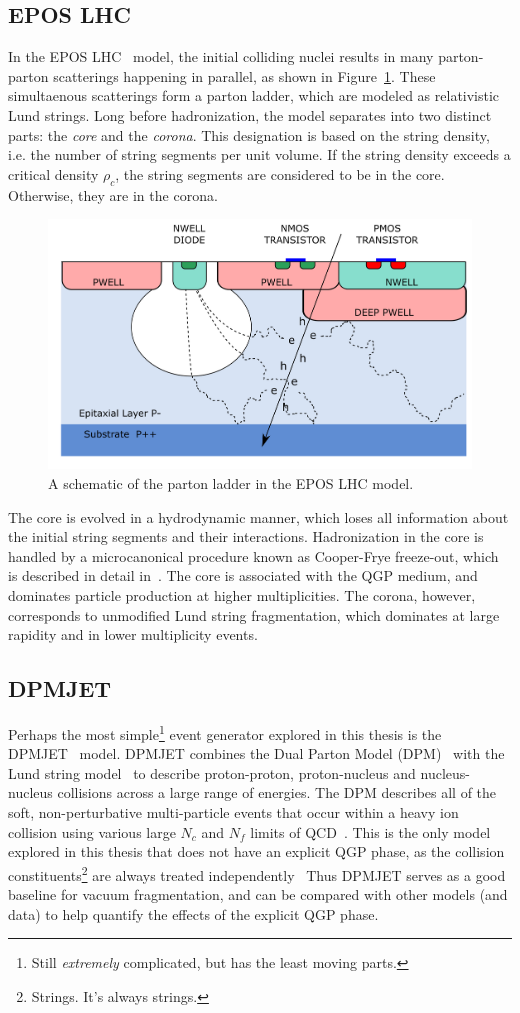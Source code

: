 \subsection{EPOS LHC}

In the EPOS LHC~\cite{EPOSLHC} model, the initial colliding nuclei results in many parton-parton scatterings happening in parallel, as shown in Figure~\ref{fig:parton_ladder}. These simultaenous scatterings form a parton ladder, which are modeled as relativistic Lund strings. Long before hadronization, the model separates into two distinct parts: the \textit{core} and the \textit{corona}. This designation is based on the string density, i.e. the number of string segments per unit volume. If the string density exceeds a critical density $\rho_c$, the string segments are considered to be in the core. Otherwise, they are in the corona. 


\begin{figure}[ht]
    \centering
    \includegraphics[width=0.5\linewidth]{figures/experiment/alpide_cross.png}
    \caption{A schematic of the parton ladder in the EPOS LHC model.}
    \label{fig:parton_ladder}
\end{figure}

The core is evolved in a hydrodynamic manner, which loses all information about the initial string segments and their interactions. Hadronization in the core is handled by a microcanonical procedure known as Cooper-Frye freeze-out, which is described in detail in~\cite{CooperFrye}. The core is associated with the QGP medium, and dominates particle production at higher multiplicities. The corona, however, corresponds to unmodified Lund string fragmentation, which dominates at large rapidity and in lower multiplicity events. 

\subsection{DPMJET}

Perhaps the most simple\footnote{Still \textit{extremely} complicated, but has the least moving parts.} event generator explored in this thesis is the DPMJET~\cite{DPMJET} model. DPMJET combines the Dual Parton Model (DPM)~\cite{DPM} with the Lund string model~\cite{LundString} to describe proton-proton, proton-nucleus and nucleus-nucleus collisions across a large range of energies. The DPM describes all of the soft, non-perturbative multi-particle events that occur within a heavy ion collision using various large $N_c$ and $N_f$ limits of QCD~\cite{}. This is the only model explored in this thesis that does not have an explicit QGP phase, as the collision constituents\footnote{Strings. It's always strings.} are always treated independently~\cite{} Thus DPMJET serves as a good baseline for vacuum fragmentation, and can be compared with other models (and data) to help quantify the effects of the explicit QGP phase.